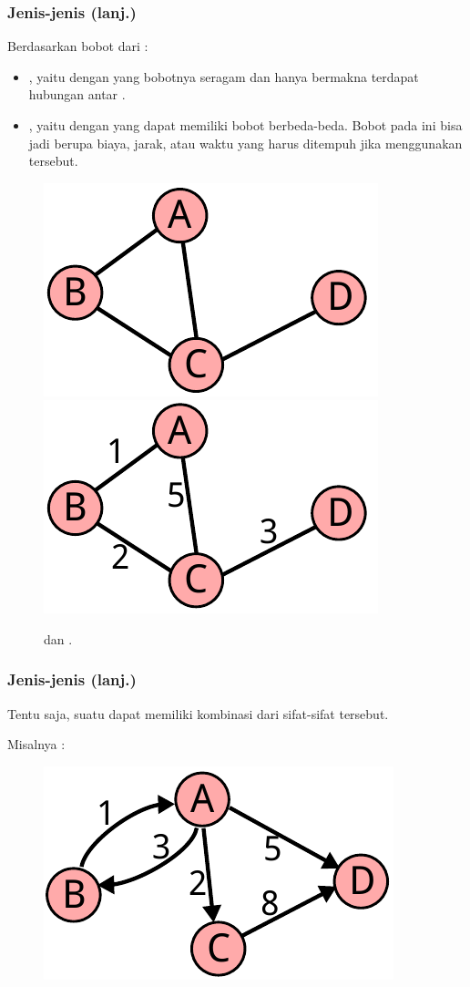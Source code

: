 \begin{frame}
\frametitle{Jenis-jenis \fGraph (lanj.)}
Berdasarkan bobot dari \fedge:
\begin{itemize}
  \item {} \fGraph, yaitu \fgraph dengan \fedge yang bobotnya seragam dan hanya bermakna terdapat hubungan antar \fnode.
  \item {} \fGraph, yaitu \fgraph dengan \fedge yang dapat memiliki bobot berbeda-beda. Bobot pada \fedge ini bisa jadi berupa biaya, jarak, atau waktu yang harus ditempuh jika menggunakan \fedge tersebut.
\end{itemize}
\begin{figure}
  \centering
  \includegraphics[width=4 cm]{asset/unweighted-undirected.pdf}
  \ \ \ \ \ \ %
  \includegraphics[width=4 cm]{asset/weighted-undirected.pdf}
  
   dan  \fgraph.
\end{figure}
\end{frame}

\begin{frame}
\frametitle{Jenis-jenis \fGraph (lanj.)}
Tentu saja, suatu \fgraph dapat memiliki kombinasi dari sifat-sifat tersebut.

Misalnya :
\newline
\begin{figure}
  \centering
  \includegraphics[width=5 cm]{asset/weighted-directed.pdf}
\end{figure}
\end{frame}

